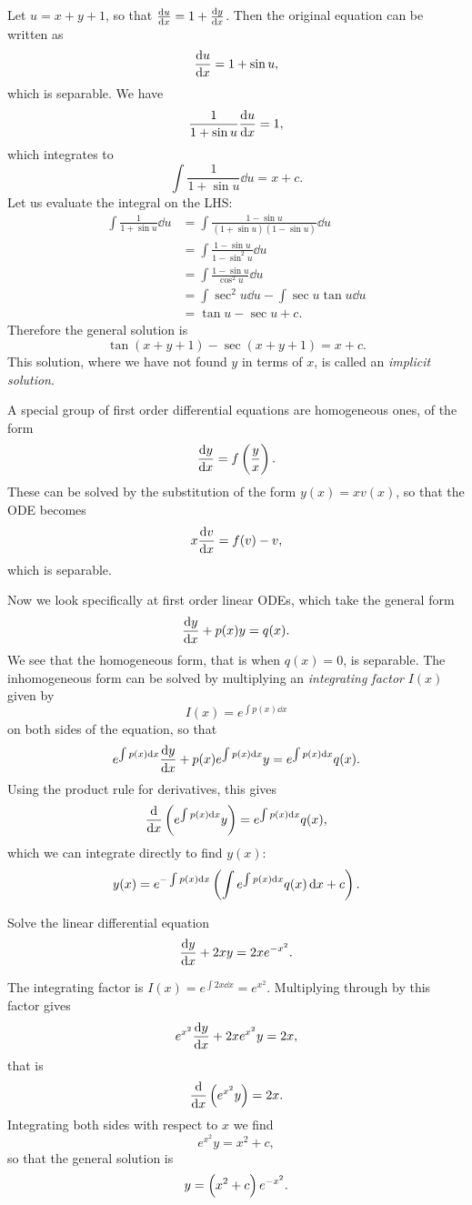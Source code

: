 \begin{solution}
Let $u=x+y+1$, so that $\dv{u}{x}=1+\dv{y}{x}$. Then the original equation can be written as
\[\dv{u}{x}=1+\sin u,\]
which is separable. We have 
\[\frac{1}{1+\sin u}\dv{u}{x}=1,\]
which integrates to
\[\int\frac{1}{1+\sin u}\dd{u}=x+c.\]
Let us evaluate the integral on the LHS:
\begin{align*}
\int\frac{1}{1+\sin u}\dd{u}&=\int\frac{1-\sin u}{(1+\sin u)(1-\sin u)}\dd{u}\\
&=\int\frac{1-\sin u}{1-\sin^2 u}\dd{u}\\
&=\int\frac{1-\sin u}{\cos^2 u}\dd{u}\\
&=\int\sec^2 u\dd{u}-\int\sec u\tan u\dd{u}\\
&=\tan u-\sec u+c.
\end{align*}
Therefore the general solution is
\[\tan(x+y+1)-\sec(x+y+1)=x+c.\]
This solution, where we have not found $y$ in terms of $x$, is called an \emph{implicit solution}.
\end{solution}

A special group of first order differential equations are homogeneous ones, of the form
\[\dv{y}{x}=f\left(\frac{y}{x}\right).\]
These can be solved by the substitution of the form $y(x)=xv(x)$, so that the ODE becomes
\[x\dv{v}{x}=f(v)-v,\]
which is separable.

Now we look specifically at first order linear ODEs, which take the general form
\[\dv{y}{x}+p(x)y=q(x).\]
We see that the homogeneous form, that is when $q(x)=0$, is separable. The inhomogeneous form can be solved by multiplying an \emph{integrating factor} $I(x)$ given by
\[I(x)=e^{\int p(x)\dd{x}}\]
on both sides of the equation, so that
\[e^{\int p(x)\dd{x}}\dv{y}{x}+p(x)e^{\int p(x)\dd{x}}y=e^{\int p(x)\dd{x}}q(x).\]
Using the product rule for derivatives, this gives
\[\dv{}{x}\left(e^{\int p(x)\dd{x}}y\right)=e^{\int p(x)\dd{x}}q(x),\]
which we can integrate directly to find $y(x)$:
\[y(x)=e^{-\int p(x)\dd{x}}\left(\int e^{\int p(x)\dd{x}}q(x)\dd{x}+c\right).\]

\begin{exercise}
Solve the linear differential equation
\[\dv{y}{x}+2xy=2xe^{-x^2}.\]
\end{exercise}

\begin{solution}
The integrating factor is $I(x)=e^{\int 2x\dd{x}}=e^{x^2}$. Multiplying through by this factor gives
\[e^{x^2}\dv{y}{x}+2xe^{x^2}y=2x,\]
that is
\[\dv{}{x}\left(e^{x^2}y\right)=2x.\]
Integrating both sides with respect to $x$ we find
\[e^{x^2}y=x^2+c,\]
so that the general solution is
\[y=\left(x^2+c\right)e^{-x^2}.\]
\end{solution}

